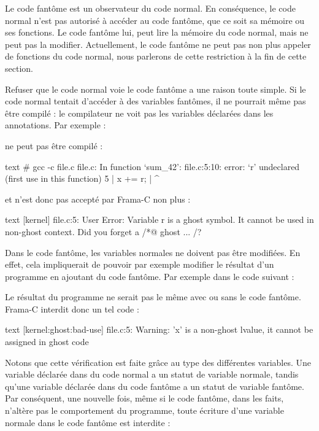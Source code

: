 

Le code fantôme est un observateur du code normal. En conséquence, le code normal
n'est pas autorisé à accéder au code fantôme, que ce soit sa mémoire ou ses
fonctions. Le code fantôme lui, peut lire la mémoire du code normal, mais ne peut
pas la modifier. Actuellement, le code fantôme ne peut pas non plus appeler de
fonctions du code normal, nous parlerons de cette restriction à la fin de cette
section.


Refuser que le code normal voie le code fantôme a une raison toute simple. Si le
code normal tentait d'accéder à des variables fantômes, il ne pourrait même pas
être compilé : le compilateur ne voit pas les variables déclarées dans les
annotations. Par exemple :




ne peut pas être compilé :


\begin{CodeBlock}{text}
# gcc -c file.c
file.c: In function ‘sum_42’:
file.c:5:10: error: ‘r’ undeclared (first use in this function)
    5 |     x += r;
      |          ^
\end{CodeBlock}


et n'est donc pas accepté par Frama-C non plus :


\begin{CodeBlock}{text}
[kernel] file.c:5: User Error:
  Variable r is a ghost symbol. It cannot be used in non-ghost context. Did you forget a /*@ ghost ... /?
\end{CodeBlock}


Dans le code fantôme, les variables normales ne doivent pas être modifiées. En effet,
cela impliquerait de pouvoir par exemple modifier le résultat d'un programme en
ajoutant du code fantôme. Par exemple dans le code suivant :




Le résultat du programme ne serait pas le même avec ou sans le code fantôme.
Frama-C interdit donc un tel code :


\begin{CodeBlock}{text}
[kernel:ghost:bad-use] file.c:5: Warning:
  'x' is a non-ghost lvalue, it cannot be assigned in ghost code
\end{CodeBlock}


Notons que cette vérification est faite grâce au type des différentes variables.
Une variable déclarée dans du code normal a un statut de variable normale, tandis
qu'une variable déclarée dans du code fantôme a un statut de variable fantôme.
Par conséquent, une nouvelle fois, même si le code fantôme, dans les faits,
n'altère pas le comportement du programme, toute écriture d'une variable normale
dans le code fantôme est interdite :


